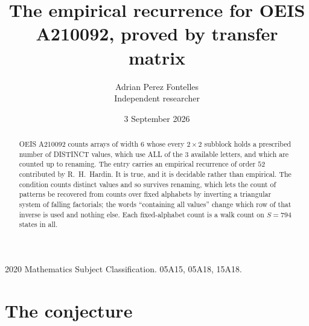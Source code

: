 \documentclass[11pt,a4paper]{article}
\title{The empirical recurrence for OEIS A210092, proved by transfer matrix}
\author{Adrian Perez Fontelles\\ \small Independent researcher}
\date{3 September 2026}
\theoremstyle{plain}
\theoremstyle{definition}
\begin{document}
\maketitle

\begin{abstract}
OEIS A210092 counts arrays of width $6$ whose every $2\times2$ subblock holds a
prescribed number of DISTINCT values, which use ALL of the $3$ available letters, and which
are counted up to renaming. The entry carries an empirical recurrence of order $52$
contributed by R.~H.~Hardin. It is true, and it is decidable rather than empirical. The
condition counts distinct values and so survives renaming, which lets the count of patterns be
recovered from counts over fixed alphabets by inverting a triangular system of falling
factorials; the words ``containing all values'' change which row of that inverse is used and
nothing else. Each fixed-alphabet count is a walk count on $S=794$ states in all.
\end{abstract}

\noindent\small 2020 Mathematics Subject Classification. 05A15, 05A18, 15A18.\normalsize

\section{The conjecture}
\end{document}
